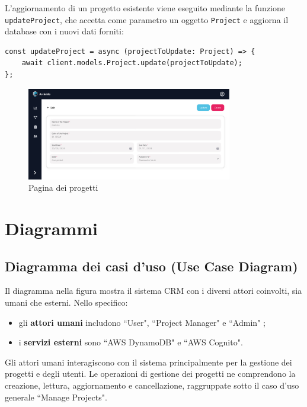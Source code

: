 \documentclass[target=bach,aauheader=,style=]{thud}
\begin{document}
\noindent L'aggiornamento di un progetto esistente viene eseguito mediante la funzione \texttt{updateProject}, che accetta come parametro un oggetto \texttt{Project} e aggiorna il database con i nuovi dati forniti:

\begin{lstlisting}[caption=funzione \texttt{updateProject}]
const updateProject = async (projectToUpdate: Project) => {
    await client.models.Project.update(projectToUpdate);
};
\end{lstlisting}

\begin{figure}[H]
    \centering
    \includegraphics[width=0.8\textwidth]{img/interfacce/table_edit.pdf} 
    \caption{Pagina dei progetti}
\end{figure}

\section{Diagrammi}
\subsection{Diagramma dei casi d'uso (Use Case Diagram)}
Il diagramma nella figura mostra il sistema CRM con i diversi attori coinvolti, sia umani che esterni. Nello specifico:

\begin{itemize}
    \item gli \textbf{attori umani} includono ``User", ``Project Manager" e ``Admin" ;
    \item i \textbf{servizi esterni} sono ``AWS DynamoDB" e ``AWS Cognito".
\end{itemize}

\noindent Gli attori umani interagiscono con il sistema principalmente per la gestione dei progetti e degli utenti. Le operazioni di gestione dei progetti ne comprendono la creazione, lettura, aggiornamento e cancellazione, raggruppate sotto il caso d'uso generale ``Manage Projects". 
\end{document}
